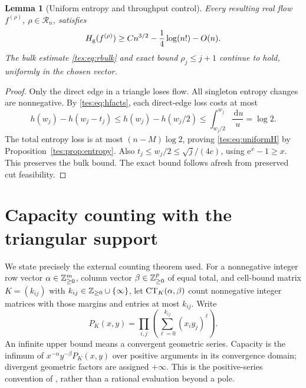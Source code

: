 \documentclass[11pt,a4paper]{article}
\newtheorem{lemma}[theorem]{Lemma}
\theoremstyle{remark}\newtheorem{remark}[theorem]{Remark}
\newcommand{\ee}{\mathrm e}\newcommand{\dd}{\,\mathrm d}
\newcommand{\Hg}{H_{\rm g}}\newcommand{\floor}[1]{\left\lfloor#1\right\rfloor}
\numberwithin{equation}{section}
\begin{document}
\begin{lemma}[Uniform entropy and throughput control]\label{tes:lem:uniform}
Every resulting real flow $f^{(\rho)}$, $\rho\in\mathcal R_n$, satisfies
\begin{equation}\label{tes:eq:uniformH}
\Hg(f^{(\rho)})\ge Cn^{3/2}-\frac14\log(n!)-O(n).
\end{equation}
The bulk estimate \eqref{tes:eq:rbulk} and exact bound $\rho_j\le j+1$ continue to hold, uniformly in the chosen vector.
\end{lemma}
\begin{proof}
Only the direct edge in a triangle loses flow. All singleton entropy changes are nonnegative. By \eqref{tes:eq:hfacts}, each direct-edge loss costs at most
\[
h(w_j)-h(w_j-t_j)\le h(w_j)-h(w_j/2)
\le\int_{w_j/2}^{w_j}\frac{\dd u}{u}=\log2.
\]
The total entropy loss is at most $(n-M)\log2$, proving \eqref{tes:eq:uniformH} by Proposition~\ref{tes:prop:entropy}. Also
$t_j\le w_j/2\le\sqrt j/(4c)$, using $\ee^x-1\ge x$. This preserves the bulk bound. The exact bound follows afresh from preserved cut feasibility.
\end{proof}

\section{Capacity counting with the triangular support}\label{tes:sec:capacity}
We state precisely the external counting theorem used. For a nonnegative integer row vector $\alpha\in\mathbb Z_{\ge0}^{m}$, column vector $\beta\in\mathbb Z_{\ge0}^{p}$ of equal total, and cell-bound matrix $K=(k_{ij})$ with $k_{ij}\in\mathbb Z_{\ge0}\cup\{\infty\}$, let $\operatorname{CT}_K(\alpha,\beta)$ count nonnegative integer matrices with those margins and entries at most $k_{ij}$. Write
\[
P_K(x,y)=\prod_{i,j}\left(\sum_{\ell=0}^{k_{ij}}(x_i y_j)^\ell\right).
\]
An infinite upper bound means a convergent geometric series. Capacity is the infimum of $x^{-\alpha}y^{-\beta}P_K(x,y)$ over positive arguments in its convergence domain; divergent geometric factors are assigned $+\infty$. This is the positive-series convention of \cite[\S5.1]{blp}, rather than a rational evaluation beyond a pole.
\end{document}
